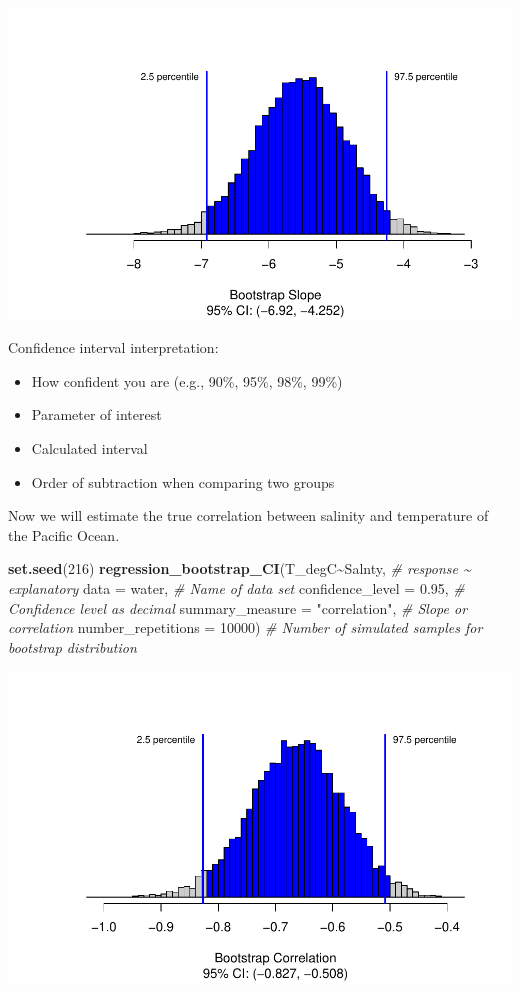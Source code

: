 \documentclass[
]{report}
\newenvironment{Shaded}{\begin{snugshade}}{\end{snugshade}}
\newcommand{\AttributeTok}[1]{\textcolor[rgb]{0.13,0.29,0.53}{#1}}
\newcommand{\CommentTok}[1]{\textcolor[rgb]{0.56,0.35,0.01}{\textit{#1}}}
\newcommand{\DecValTok}[1]{\textcolor[rgb]{0.00,0.00,0.81}{#1}}
\newcommand{\FloatTok}[1]{\textcolor[rgb]{0.00,0.00,0.81}{#1}}
\newcommand{\FunctionTok}[1]{\textcolor[rgb]{0.13,0.29,0.53}{\textbf{#1}}}
\newcommand{\NormalTok}[1]{#1}
\newcommand{\SpecialCharTok}[1]{\textcolor[rgb]{0.81,0.36,0.00}{\textbf{#1}}}
\newcommand{\StringTok}[1]{\textcolor[rgb]{0.31,0.60,0.02}{#1}}
\begin{document}
\begin{center}\includegraphics[width=0.7\linewidth]{13-VN13-regression_files/figure-latex/unnamed-chunk-15-1} \end{center}

Confidence interval interpretation:

\begin{itemize}
\item
  How confident you are (e.g., 90\%, 95\%, 98\%, 99\%)
\item
  Parameter of interest
\item
  Calculated interval
\item
  Order of subtraction when comparing two groups
\end{itemize}

\vspace{0.8in}

Now we will estimate the true correlation between salinity and temperature of the Pacific Ocean.

\begin{Shaded}
\begin{Highlighting}[]
\FunctionTok{set.seed}\NormalTok{(}\DecValTok{216}\NormalTok{)}
\FunctionTok{regression\_bootstrap\_CI}\NormalTok{(T\_degC}\SpecialCharTok{\textasciitilde{}}\NormalTok{Salnty, }\CommentTok{\# response \textasciitilde{} explanatory}
   \AttributeTok{data =}\NormalTok{ water, }\CommentTok{\# Name of data set}
   \AttributeTok{confidence\_level =} \FloatTok{0.95}\NormalTok{, }\CommentTok{\# Confidence level as decimal}
   \AttributeTok{summary\_measure =} \StringTok{"correlation"}\NormalTok{, }\CommentTok{\# Slope or correlation}
   \AttributeTok{number\_repetitions =} \DecValTok{10000}\NormalTok{) }\CommentTok{\# Number of simulated samples for bootstrap distribution}
\end{Highlighting}
\end{Shaded}

\begin{center}\includegraphics[width=0.7\linewidth]{13-VN13-regression_files/figure-latex/unnamed-chunk-16-1} \end{center}
\end{document}
